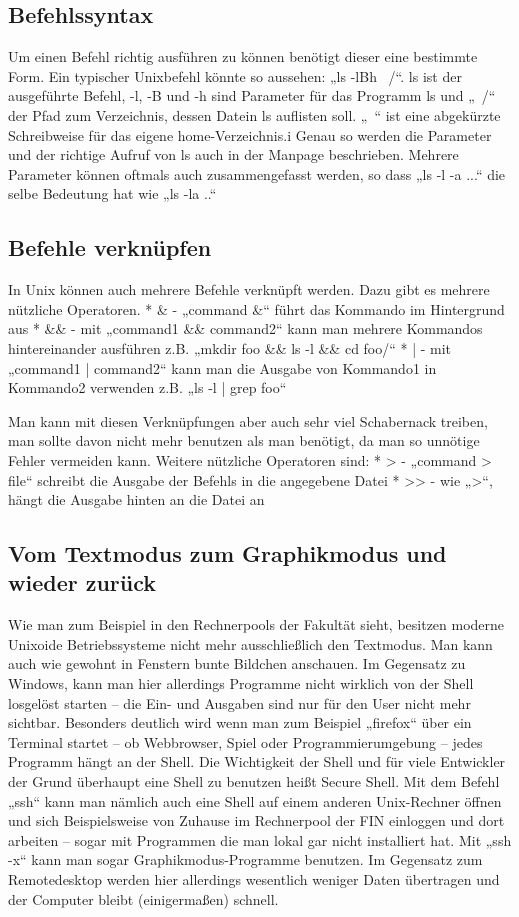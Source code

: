 \subsection{Befehlssyntax}
Um einen Befehl richtig ausführen zu können benötigt dieser eine bestimmte Form. Ein typischer Unixbefehl könnte so aussehen:
„ls -lBh ~/“. ls ist der ausgeführte Befehl, -l, -B und -h sind Parameter für das Programm ls und „~/“ der Pfad zum Verzeichnis, dessen Datein ls auflisten soll. „~“ ist eine abgekürzte Schreibweise für das eigene home-Verzeichnis.i
Genau so werden die Parameter und der richtige Aufruf von ls auch in der Manpage beschrieben. Mehrere Parameter können oftmals auch zusammengefasst werden, so dass „ls -l -a ...“ die selbe Bedeutung hat wie „ls -la ..“

\subsection{Befehle verknüpfen}
In Unix können auch mehrere Befehle verknüpft werden. Dazu gibt es mehrere nützliche Operatoren.
* \& - „command \&“ führt das Kommando im Hintergrund aus
* \&\& - mit „command1 \&\& command2“ kann man mehrere Kommandos hintereinander ausführen z.B. „mkdir foo \&\& ls -l \&\& cd foo/“
* | - mit „command1 | command2“ kann man die Ausgabe von Kommando1 in Kommando2 verwenden  z.B. „ls -l | grep foo“

Man kann mit diesen Verknüpfungen aber auch sehr viel Schabernack treiben, man sollte davon nicht mehr benutzen als man benötigt, da man so unnötige Fehler vermeiden kann.
Weitere nützliche Operatoren sind:
* > - „command > file“ schreibt die Ausgabe der Befehls in die angegebene Datei
* >> - wie „>“, hängt die Ausgabe hinten an die Datei an

\subsection{Vom Textmodus zum Graphikmodus und wieder zurück}
Wie man zum Beispiel in den Rechnerpools der Fakultät sieht, besitzen moderne Unixoide Betriebssysteme nicht mehr ausschließlich den Textmodus. Man kann auch wie gewohnt in Fenstern bunte Bildchen anschauen.
Im Gegensatz zu Windows, kann man hier allerdings Programme nicht wirklich von der Shell losgelöst starten – die Ein- und Ausgaben sind nur für den User nicht mehr sichtbar. Besonders deutlich wird wenn man zum Beispiel „firefox“ über ein Terminal startet – ob Webbrowser, Spiel oder Programmierumgebung – jedes Programm hängt an der Shell.
Die Wichtigkeit der Shell und für viele Entwickler der Grund überhaupt eine Shell zu benutzen heißt Secure Shell. Mit dem Befehl „ssh“ kann man nämlich auch eine Shell auf einem anderen Unix-Rechner öffnen und sich Beispielsweise von Zuhause im Rechnerpool der FIN einloggen und dort arbeiten – sogar mit Programmen die man lokal gar nicht installiert hat. Mit „ssh -x“ kann man sogar Graphikmodus-Programme benutzen.
Im Gegensatz zum Remotedesktop werden hier allerdings wesentlich weniger Daten übertragen und der Computer bleibt (einigermaßen) schnell.
